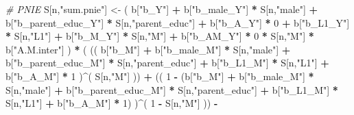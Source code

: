 \documentclass[
]{book}
\newenvironment{Shaded}{\begin{snugshade}}{\end{snugshade}}
\newcommand{\CommentTok}[1]{\textcolor[rgb]{0.56,0.35,0.01}{\textit{#1}}}
\newcommand{\DecValTok}[1]{\textcolor[rgb]{0.00,0.00,0.81}{#1}}
\newcommand{\NormalTok}[1]{#1}
\newcommand{\OtherTok}[1]{\textcolor[rgb]{0.56,0.35,0.01}{#1}}
\newcommand{\SpecialCharTok}[1]{\textcolor[rgb]{0.81,0.36,0.00}{\textbf{#1}}}
\newcommand{\StringTok}[1]{\textcolor[rgb]{0.31,0.60,0.02}{#1}}
\begin{document}
\begin{Shaded}
\begin{Highlighting}[]
    \CommentTok{\# PNIE }
\NormalTok{    S[n,}\StringTok{"sum.pnie"}\NormalTok{] }\OtherTok{\textless{}{-}}\NormalTok{ ( b[}\StringTok{"b\_Y"}\NormalTok{] }\SpecialCharTok{+} 
\NormalTok{                           b[}\StringTok{"b\_male\_Y"}\NormalTok{] }\SpecialCharTok{*}\NormalTok{ S[n,}\StringTok{"male"}\NormalTok{] }\SpecialCharTok{+} 
\NormalTok{                           b[}\StringTok{"b\_parent\_educ\_Y"}\NormalTok{] }\SpecialCharTok{*}\NormalTok{ S[n,}\StringTok{"parent\_educ"}\NormalTok{] }\SpecialCharTok{+} 
\NormalTok{                           b[}\StringTok{"b\_A\_Y"}\NormalTok{] }\SpecialCharTok{*} \DecValTok{0} \SpecialCharTok{+} 
\NormalTok{                           b[}\StringTok{"b\_L1\_Y"}\NormalTok{] }\SpecialCharTok{*}\NormalTok{ S[n,}\StringTok{"L1"}\NormalTok{] }\SpecialCharTok{+}
\NormalTok{                           b[}\StringTok{"b\_M\_Y"}\NormalTok{] }\SpecialCharTok{*}\NormalTok{ S[n,}\StringTok{"M"}\NormalTok{] }\SpecialCharTok{+}
\NormalTok{                           b[}\StringTok{"b\_AM\_Y"}\NormalTok{] }\SpecialCharTok{*} \DecValTok{0} \SpecialCharTok{*}\NormalTok{ S[n,}\StringTok{"M"}\NormalTok{] }\SpecialCharTok{*}\NormalTok{ b[}\StringTok{"A.M.inter"}\NormalTok{] ) }\SpecialCharTok{*}
\NormalTok{      ( (( b[}\StringTok{"b\_M"}\NormalTok{] }\SpecialCharTok{+} 
\NormalTok{             b[}\StringTok{"b\_male\_M"}\NormalTok{] }\SpecialCharTok{*}\NormalTok{ S[n,}\StringTok{"male"}\NormalTok{] }\SpecialCharTok{+} 
\NormalTok{             b[}\StringTok{"b\_parent\_educ\_M"}\NormalTok{] }\SpecialCharTok{*}\NormalTok{ S[n,}\StringTok{"parent\_educ"}\NormalTok{] }\SpecialCharTok{+} 
\NormalTok{             b[}\StringTok{"b\_L1\_M"}\NormalTok{] }\SpecialCharTok{*}\NormalTok{ S[n,}\StringTok{"L1"}\NormalTok{] }\SpecialCharTok{+}
\NormalTok{             b[}\StringTok{"b\_A\_M"}\NormalTok{] }\SpecialCharTok{*} \DecValTok{1}\NormalTok{ )}\SpecialCharTok{\^{}}\NormalTok{( S[n,}\StringTok{"M"}\NormalTok{] )) }\SpecialCharTok{+}
\NormalTok{          (( }\DecValTok{1} \SpecialCharTok{{-}}\NormalTok{ (b[}\StringTok{"b\_M"}\NormalTok{] }\SpecialCharTok{+} 
\NormalTok{                    b[}\StringTok{"b\_male\_M"}\NormalTok{] }\SpecialCharTok{*}\NormalTok{ S[n,}\StringTok{"male"}\NormalTok{] }\SpecialCharTok{+} 
\NormalTok{                    b[}\StringTok{"b\_parent\_educ\_M"}\NormalTok{] }\SpecialCharTok{*}\NormalTok{ S[n,}\StringTok{"parent\_educ"}\NormalTok{] }\SpecialCharTok{+} 
\NormalTok{                    b[}\StringTok{"b\_L1\_M"}\NormalTok{] }\SpecialCharTok{*}\NormalTok{ S[n,}\StringTok{"L1"}\NormalTok{] }\SpecialCharTok{+}
\NormalTok{                    b[}\StringTok{"b\_A\_M"}\NormalTok{] }\SpecialCharTok{*} \DecValTok{1}\NormalTok{) )}\SpecialCharTok{\^{}}\NormalTok{( }\DecValTok{1} \SpecialCharTok{{-}}\NormalTok{ S[n,}\StringTok{"M"}\NormalTok{] )) }\SpecialCharTok{{-}}

\end{Highlighting}
\end{Shaded}
\end{document}
